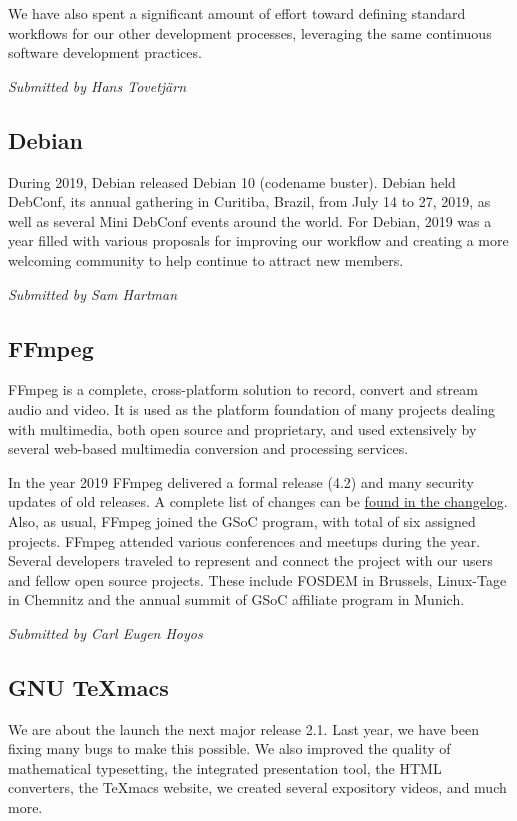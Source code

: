 \documentclass[a4paper]{report}
\begin{document}
We have also spent a significant amount of effort toward defining
standard workflows for our other development processes, leveraging the
same continuous software development practices.

{\em Submitted by Hans Tovetjärn}

\subsection{Debian}

During 2019, Debian released Debian 10 (codename buster).  Debian held
DebConf, its annual gathering in Curitiba, Brazil, from July 14 to 27,
2019, as well as several Mini DebConf events around the world.  For
Debian, 2019 was a year filled with various proposals for improving our
workflow and creating a more welcoming community to help continue to
attract new members.

{\em Submitted by Sam Hartman}

\subsection{FFmpeg}

FFmpeg is a complete, cross-platform solution to record, convert and
stream audio and video. It is used as the platform foundation of many
projects dealing with multimedia, both open source and proprietary, and
used extensively by several web-based multimedia conversion and
processing services.

In the year 2019 FFmpeg delivered a formal release (4.2) and many
security updates of old releases. A complete list of changes can be
\href{https://git.ffmpeg.org/gitweb/ffmpeg.git/blob/HEAD:/Changelog}{found
in the changelog}.  Also, as usual, FFmpeg joined the GSoC program, with
total of six assigned projects.  FFmpeg attended various conferences and
meetups during the year. Several developers traveled to represent and
connect the project with our users and fellow open source projects.
These include FOSDEM in Brussels, Linux-Tage in Chemnitz and the annual
summit of GSoC affiliate program in Munich.

{\em Submitted by Carl Eugen Hoyos}

\subsection{GNU TeXmacs}

We are about the launch the next major release 2.1.  Last year, we have
been fixing many bugs to make this possible.  We also improved the
quality of mathematical typesetting, the integrated presentation tool,
the HTML converters, the TeXmacs website, we created several expository
videos, and much more.
\end{document}
